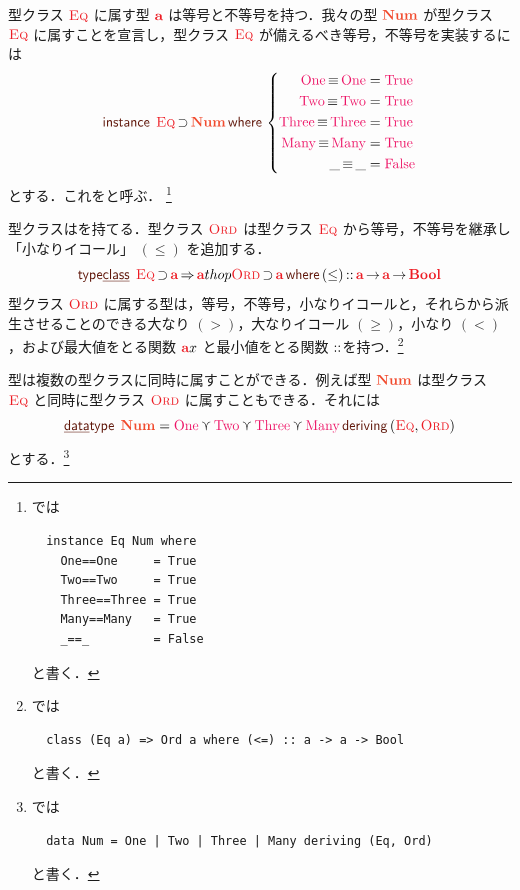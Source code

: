 \documentclass[a5paper,twoside,fleqn,draft]{jsbook}
\begin{document}
型クラス $\hEq$ に属す型 $\hTypeName{a}$ は等号と不等号を持つ．我々の型 $\mType{Num}$ が型クラス $\hEq$ に属すことを宣言し，型クラス $\hEq$ が備えるべき等号，不等号を実装するには
\begin{equation}
  \mInstanceDecl\;\hEq\hHasElementsOf\mType{Num}
  \mWhere{}
  \left\{
  \begin{aligned}
    \mNumOne\hIfEq\mNumOne&=\hTrue\\
    \mNumTwo\hIfEq\mNumTwo&=\hTrue\\
    \mNumThree\hIfEq\mNumThree&=\hTrue\\
    \mNumMany\hIfEq\mNumMany&=\hTrue\\
    \_\hIfEq\_&=\hFalse
  \end{aligned}
  \right.
\end{equation}
とする．これをと呼ぶ．
\footnote{\haskell では
\begin{verbatim}
  instance Eq Num where
    One==One     = True
    Two==Two     = True
    Three==Three = True
    Many==Many   = True
    _==_         = False
\end{verbatim}
と書く．}


型クラスはを持てる．型クラス $\hOrd$ は型クラス $\hEq$ から等号，不等号を継承し「小なりイコール」 $(\le)$ を追加する．
\begin{equation}
  \mTypeClassDecl\;\hEq\hHasElementsOf\hTypeName{a}
  \hAndThen\hTypeName{a}thop{\hOrd}\hHasElementsOf\hTypeName{a}
  \mWhere{}(\le)\hIsTypeOf\mProjEXP{\hTypeName{a} }{\mProjEXP{\hTypeName{a} }{\hBool}}
\end{equation}
型クラス $\hOrd$ に属する型は，等号，不等号，小なりイコールと，それらから派生させることのできる大なり $(>)$，大なりイコール $(\ge)$，小なり $(<)$，および最大値をとる関数 $\hTypeName{a}x$ と最小値をとる関数 $\operatorname{:\!:}$を持つ．\footnote{\haskell では
\begin{verbatim}
  class (Eq a) => Ord a where (<=) :: a -> a -> Bool
\end{verbatim}
と書く．}

\separator

型は複数の型クラスに同時に属すことができる．例えば型 $\mType{Num}$ は型クラス $\hEq$ と同時に型クラス $\hOrd$ に属すこともできる．それには
\begin{equation}
\mDataType\;\mType{Num}
=\mNumOne\mValueOr\mNumTwo\mValueOr\mNumThree\mValueOr\mNumMany
\mDeriving{}(\hEq,\hOrd)
\end{equation}
とする．\footnote{\haskell では
\begin{verbatim}
  data Num = One | Two | Three | Many deriving (Eq, Ord)
\end{verbatim}
と書く．}
\end{document}
